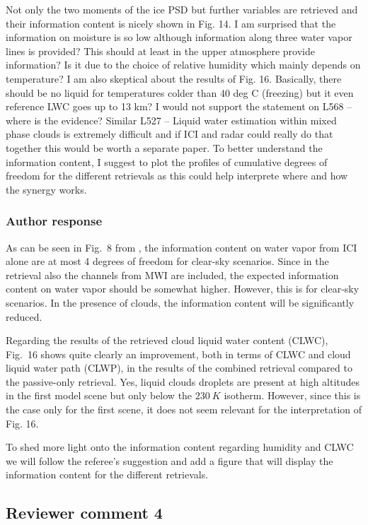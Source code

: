 \documentclass[11pt]{scrartcl}
\begin{document}
Not only the two moments of the ice PSD but further variables are retrieved and
their information content is nicely shown in Fig. 14. I am surprised that the
information on moisture is so low although information along three water vapor
lines is provided? This should at least in the upper atmosphere provide
information? Is it due to the choice of relative humidity which mainly depends
on temperature? I am also skeptical about the results of Fig. 16. Basically,
there should be no liquid for temperatures colder than 40 deg C (freezing) but
it even reference LWC goes up to 13 km? I would not support the statement on
L568 – where is the evidence? Similar L527 – Liquid water estimation within
mixed phase clouds is extremely difficult and if ICI and radar could really do
that together this would be worth a separate paper. To better understand the
information content, I suggest to plot the profiles of cumulative degrees of
freedom for the different retrievals as this could help interprete where and how
the synergy works.

\subsubsection*{Author response}

As can be seen in Fig.~8 from \cite{eriksson19}, the information content on
water vapor from ICI alone are at most 4 degrees of freedom for clear-sky
scenarios. Since in the retrieval also the channels from MWI are included, the
expected information content on water vapor should be somewhat higher. However, this is
for clear-sky scenarios. In the presence of clouds, the information content will
be significantly reduced.

Regarding the results of the retrieved cloud liquid water content (CLWC),
Fig.~16 shows quite clearly an improvement, both in terms of CLWC and cloud
liquid water path (CLWP), in the results of the combined retrieval compared to
the passive-only retrieval. Yes, liquid clouds droplets are present at high
altitudes in the first model scene but only below the $230\ \unit{K}$ isotherm.
However, since this is the case only for the first scene, it does not seem
relevant for the interpretation of Fig. 16.

To shed more light onto the information content regarding humidity and
CLWC we will follow the referee's suggestion and add a figure that will display
the information content for the different retrievals.

\subsection*{Reviewer comment 4}
\end{document}
